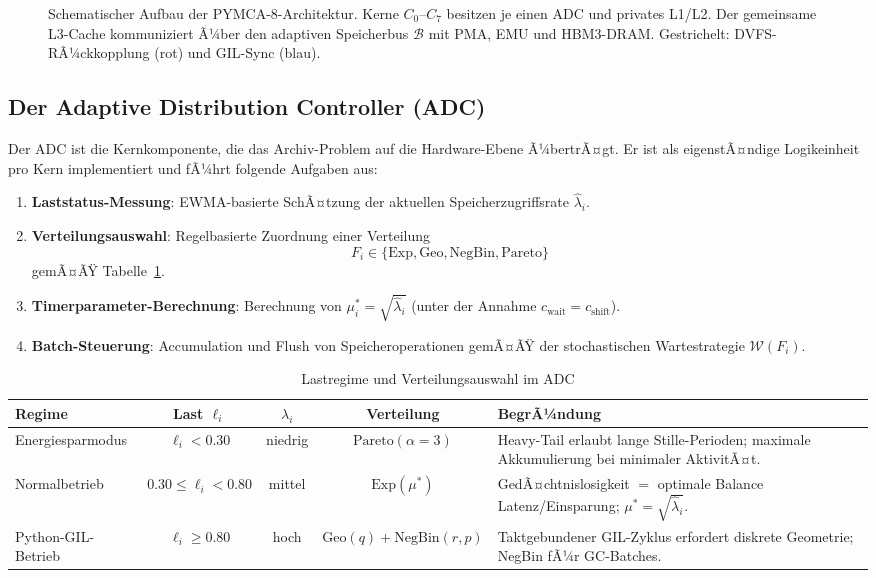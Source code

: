﻿\documentclass[a4paper,12pt]{scrreprt}
\theoremstyle{definition}
\newcommand{\Exp}{\mathrm{Exp}}
\newcommand{\Geo}{\mathrm{Geo}}
\newcommand{\NBin}{\mathrm{NegBin}}
\newcommand{\Pareto}{\mathrm{Pareto}}
\begin{document}
\begin{figure}[h!]
\begin{tikzpicture}
		\end{tikzpicture}
		\caption{Schematischer Aufbau der PYMCA-8-Architektur. Kerne $C_0$--$C_7$
			besitzen je einen ADC und privates L1/L2. Der gemeinsame L3-Cache
			kommuniziert Ã¼ber den adaptiven Speicherbus $\mathcal{B}$ mit PMA, EMU
			und HBM3-DRAM. Gestrichelt: DVFS-RÃ¼ckkopplung (rot) und GIL-Sync (blau).}
		\label{fig:arch_tikz}
	\end{figure}
	
	\subsection{Der Adaptive Distribution Controller (ADC)}
	
	Der ADC ist die Kernkomponente, die das Archiv-Problem auf die
	Hardware-Ebene Ã¼bertrÃ¤gt. Er ist als eigenstÃ¤ndige Logikeinheit
	pro Kern implementiert und fÃ¼hrt folgende Aufgaben aus:
	
	\begin{enumerate}[label=\arabic*.,noitemsep]
		\item \textbf{Laststatus-Messung}: EWMA-basierte SchÃ¤tzung der aktuellen
		Speicherzugriffsrate $\hat\lambda_i$.
		\item \textbf{Verteilungsauswahl}: Regelbasierte Zuordnung einer Verteilung
		$$F_i \in \{\Exp, \Geo, \NBin, \Pareto\}$$ gemÃ¤ÃŸ Tabelle~\ref{tab:regime}.
		\item \textbf{Timerparameter-Berechnung}: Berechnung von $\mu_i^* = \sqrt{\hat\lambda_i}$
		(unter der Annahme $c_{\mathrm{wait}} = c_{\mathrm{shift}}$).
		\item \textbf{Batch-Steuerung}: Accumulation und Flush von Speicheroperationen
		gemÃ¤ÃŸ der stochastischen Wartestrategie $\mathcal{W}(F_i)$.
	\end{enumerate}
	
	\begin{table}
		\centering
		\caption{Lastregime und Verteilungsauswahl im ADC}
		\label{tab:regime}
		\renewcommand{\arraystretch}{1.3}
		\begin{tabular}{lcccp{4.5cm}}
			\toprule
			\textbf{Regime} & \textbf{Last $\ell_i$} & \textbf{$\lambda_i$} &
			\textbf{Verteilung} & \textbf{BegrÃ¼ndung} \\
			\midrule
			Energiesparmodus & $\ell_i < 0.30$ & niedrig &
			$\Pareto(\alpha=3)$ & Heavy-Tail erlaubt lange Stille-Perioden;
			maximale Akkumulierung bei minimaler AktivitÃ¤t. \\
			Normalbetrieb & $0.30 \le \ell_i < 0.80$ & mittel &
			$\Exp(\mu^*)$ & GedÃ¤chtnislosigkeit $=$ optimale Balance
			Latenz/Einsparung; $\mu^* = \sqrt{\hat\lambda_i}$. \\
			Python-GIL-Betrieb & $\ell_i \ge 0.80$ & hoch &
			$\Geo(q) + \NBin(r,p)$ & Taktgebundener GIL-Zyklus erfordert
			diskrete Geometrie; NegBin fÃ¼r GC-Batches. \\
			\bottomrule
		\end{tabular}
	\end{table}
	
\end{document}
